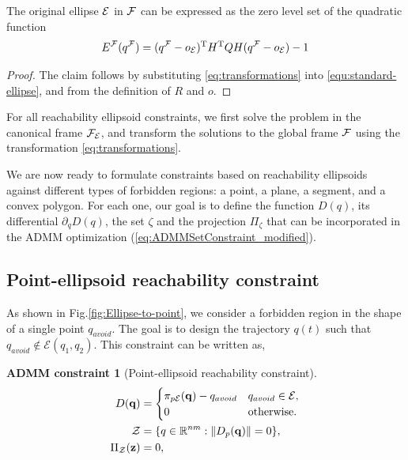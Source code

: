 \documentclass[journal]{IEEEtran}  %
\newtheorem{constraint}{ADMM constraint}
\def\sZ{\mathcal{Z}}
\begin{document}
\begin{lemma}
The original ellipse $\mathcal{E}$ in $\mathcal{F}$ can be expressed as the zero level set of the quadratic function
   \begin{equation}\label{eq:ellpsoid from canonical}
     {E^{\mathcal{F}}}({q^{\mathcal{F}}}) = ({q^{\mathcal{F}}}-o_{\mathcal{E}})^\mathrm{T} H^\mathrm{T} Q H ({q^{\mathcal{F}}}-o_{\mathcal{E}}) - 1
     \end{equation}
\end{lemma}
\begin{proof}
    The claim follows by substituting  \eqref{eq:transformations} into \eqref{equ:standard-ellipse}, and from the definition of $R$ and $o$.
\end{proof}
For all reachability ellipsoid constraints, we first solve the problem in the canonical frame $\mathcal{F}_{\mathcal{E}}$, and transform the solutions to the global frame $\mathcal{F}$ using the transformation \eqref{eq:transformations}.

We are now ready to formulate constraints based on reachability ellipsoids against different types of forbidden regions: a point, a plane, a segment, and a convex polygon. For each one, our goal is to define the function $D(q)$, its differential $\partial_qD(q)$, the set $\zeta$ and the projection $\Pi_\zeta$ that can be incorporated in the ADMM optimization (\ref{eq:ADMMSetConstraint_modified}).

\subsection{Point-ellipsoid reachability constraint}\label{sec:ellipsoid-point}
As shown in Fig.\ref{fig:Ellipse-to-point}, we consider a forbidden region in the shape of a single point $q_{avoid}$. The goal is to design the trajectory $q(t)$ such that $q_{avoid}\notin\mathcal{E}(q_1,q_2)$. This constraint can be written as, 

\begin{constraint}[Point-ellipsoid reachability constraint]
\begin{align}
D(\vq) &=  \begin{cases}
      \pi_{p\cE}(\vq) - q_{avoid} & q_{avoid} \in \cE, \\
      {0} & \textrm{otherwise}.
    \end{cases} \label{eq:point_ellipsoid_constraint}\\
  \sZ &= \{q\in\mathbb{R}^{nm}:\norm{D_p(\vq)} = 0 \},\\
   \Pi_\sZ(\vz) & = 0, 
\end{align}
\end{constraint}
\end{document}
